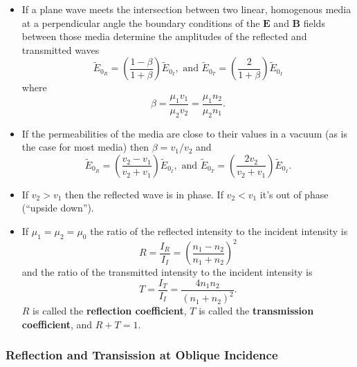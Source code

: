 \documentclass{article}
\renewcommand{\vec}[1]{\boldsymbol{\mathbf{#1}}}
\begin{document}
\begin{itemize}
  \item If a plane wave meets the intersection between two linear, homogenous media at a perpendicular angle the boundary conditions of the $\vec{E}$ and $\vec{B}$ fields between those media determine the amplitudes of the reflected and transmitted waves \[\tilde{E}_{0_R} = \left( \frac{1 - \beta}{1 + \beta} \right) \tilde{E}_{0_I}, \text{ and } \tilde{E}_{0_T} = \left( \frac{2}{1 + \beta} \right) \tilde{E}_{0_I}\] where \[\beta = \frac{\mu_1 v_1}{\mu_2 v_2} = \frac{\mu_1 n_2}{\mu_2 n_1}.\]

  \item If the permeabilities of the media are close to their values in a vacuum (as is the case for most media) then $\beta = v_1 / v_2$ and \[\tilde{E}_{0_R} = \left( \frac{v_2 - v_1}{v_2 + v_1} \right) \tilde{E}_{0_I}, \text{ and } \tilde{E}_{0_T} = \left( \frac{2 v_2}{v_2 + v_1} \right) \tilde{E}_{0_I}.\]

  \item If $v_2 > v_1$ then the reflected wave is in phase. If $v_2 < v_1$ it's out of phase (``upside down'').

  \item If $\mu_1 = \mu_2 = \mu_0$ the ratio of the reflected intensity to the incident intensity is \[R = \frac{I_R}{I_I} = \left( \frac{n_1 - n_2}{n_1 + n_2} \right)^2\] and the ratio of the transmitted intensity to the incident intensity is \[T = \frac{I_T}{I_I} = \frac{4 n_1 n_2}{(n_1 + n_2)^2}.\] $R$ is called the \textbf{reflection coefficient}, $T$ is called the \textbf{transmission coefficient}, and $R + T = 1$.
\end{itemize}

\subsubsection{Reflection and Transission at Oblique Incidence}
\end{document}
